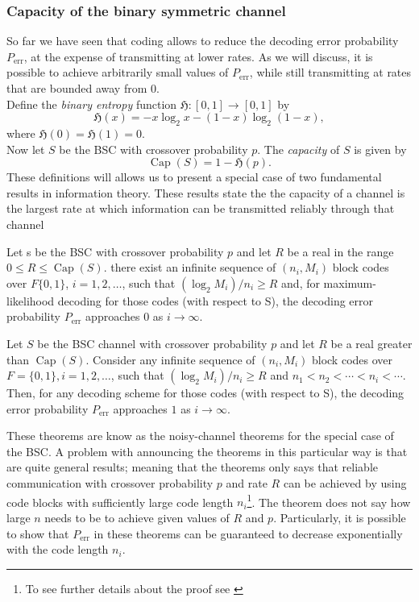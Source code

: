 \subsubsection{Capacity of the binary symmetric channel}
So far we have seen that coding allows to reduce the decoding error probability $P_{\text{err}}$, at the expense of transmitting at lower rates. As we will discuss, it is possible to achieve arbitrarily small values of $P_{\text{err}}$, while still transmitting at rates that are bounded away from $0$.\\
\indent Define the \textit{binary entropy} function $\mathfrak{H}:[0,1]\to[0,1]$ by
\begin{equation}
\mathfrak{H}(x) = -x\log_2 x-(1-x)\log_2 (1-x),
\label{CH2:Binary entropy}
\end{equation}
where $\mathfrak{H}(0)=\mathfrak{H}(1)=0$.\\
\indent Now let $S$ be the BSC with crossover probability $p$. The \textit{capacity} of $S$ is given by
\begin{equation}
\operatorname{Cap}(S) = 1-\mathfrak{H}(p).
\end{equation}
These definitions will allows us to present a special case of two fundamental results in information theory. These results state the the capacity of a channel is the largest rate at which information can be transmitted reliably through that channel
\begin{theorem}
Let s be the BSC with crossover probability $p$ and let $R$ be a real in the range $0\leq R \leq \operatorname{Cap}(S)$. there exist an infinite sequence of $(n_i,M_i)$ block codes over $F\{0,1\}$, $i=1,2,\ldots$, such that $(\log_2 M_i)/n_i\geq R$ and, for maximum-likelihood decoding for those codes (with respect to S), the decoding error probability $P_{\text{err}}$ approaches $0$ as $i\to \infty$.
\end{theorem}
\begin{theorem} Let $S$ be the BSC channel with crossover probability $p$ and let $R$ be a real greater than $\operatorname{Cap}(S)$. Consider any infinite sequence of $(n_i,M_i)$ block codes over $F=\{0,1\}, i = 1,2,\ldots$, such that $(\log_2 M_i)/n_i\geq R$ and $n_1< n_2<\cdots< n_i < \cdots$. Then, for any decoding scheme for those codes (with respect to S), the decoding error probability $P_{\text{err}}$ approaches $1$ as $i\to \infty$.
\end{theorem}
These theorems are know as the noisy-channel theorems for the special case of the BSC. A problem with announcing the theorems in this particular way is that are quite general results; meaning that the theorems only says that reliable communication with crossover probability $p$ and rate $R$ can be achieved by using code blocks with sufficiently large code length $n_i$\footnote{To see further details about the proof see \cite{mackay_information_2003}}. The theorem does not say how large $n$ needs to be to achieve given values of $R$ and $p$. Particularly, it is possible to show that $P_{\text{err}}$ in these theorems can be guaranteed to decrease exponentially with the code length $n_i$.\\
